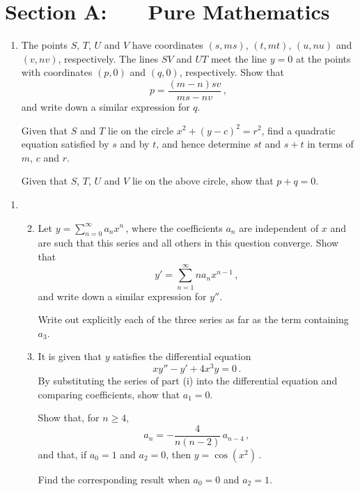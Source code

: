 \documentclass[a4, 11pt]{report}
\newlength{\qspace}
\newcounter{qnumber}
\newenvironment{question}%
 {\vspace{\qspace}
  \begin{enumerate}[\bfseries 1\quad][10]%
    \setcounter{enumi}{\value{qnumber}}%
    \item%
 }
{
  \end{enumerate}
  \filbreak
  \stepcounter{qnumber}
 }
\newenvironment{questionparts}[1][1]%
 {
  \begin{enumerate}[\bfseries (i)]%
    \setcounter{enumii}{#1}
    \addtocounter{enumii}{-1}
    \setlength{\itemsep}{5mm}
    \setlength{\parskip}{8pt}
 }
 {
  \end{enumerate}
 }
\def\ge{\geqslant}
\begin{document}
\setcounter{page}{2}

 
\section*{Section A: \ \ \ Pure Mathematics}

\begin{question}
The points $S$, $T$, $U$ and $V$ have coordinates
$(s,ms)$, $(t,mt)$, $(u,nu)$ and $(v,nv)$, respectively.
The lines $SV$ and $UT$ meet the line $y=0$ at the points
with coordinates $(p,0)$ and $(q,0)$, respectively.
Show that 
\[
p = \frac{(m-n)sv}{ms-nv}\,,
\]
and write down a similar expression for $q$. 

Given that $S$ and $T$ lie on the
circle $x^2 + (y-c)^2 = r^2$, find a quadratic equation
 satisfied by $s$ and by $t$, and hence determine $st$ and $s+t$ in 
 terms of $m$, $c$ and $r$.

 Given that $S$, $T$, $U$ and $V$ lie on the above circle, show that 
 $p+q=0$.
\end{question}

\begin{question}
\begin{questionparts}
\item
Let $\displaystyle y= \sum_{n=0}^\infty a_n x^n\,$, where
the coefficients $a_n$ are independent of $x$ and are such
that this series and all others in this question converge.
Show that 
\[
 \displaystyle y'= \sum_{n=1}^\infty na_n x^{n-1}\,,
\]
and write down a similar expression for $y''$.

Write out explicitly  each of the three
series as far as the term containing $a_3$.

\item
It is given that $y$ satisfies the differential
equation
\[
xy''-y'+4x^3y =0\,.
\]
By substituting the series of part (i) into the differential
equation and comparing coefficients, show that $a_1=0$. 

 Show that, for $n\ge4$, 
\[ a_n =- \frac{4}{n(n-2)}\, a_{n-4}\,,
\]
and  that, if $a_0=1$ and $a_2=0$, then $ y=\cos (x^2)\,$.

Find the corresponding result when $a_0=0$ and $a_2=1$.
\end{questionparts}
\end{question}
\end{document}
